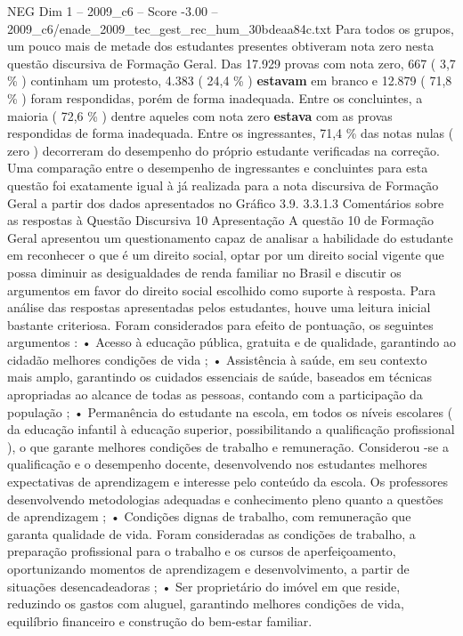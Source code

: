 \begin{textsample}{NEG Dim 1 – 2009\_c6 – Score -3.00 – 2009\_c6/enade\_2009\_tec\_gest\_rec\_hum\_30bdeaa84c.txt}
Para todos os grupos, um pouco mais de metade dos estudantes presentes obtiveram nota zero nesta questão discursiva de Formação Geral.
Das 17.929 provas com nota zero, 667 ( 3,7 \% ) continham um protesto, 4.383 ( 24,4 \% ) \textbf{estavam} em branco e 12.879 ( 71,8 \% ) foram respondidas, porém de forma inadequada.
Entre os concluintes, a maioria ( 72,6 \% ) dentre aqueles com nota zero \textbf{estava} com as provas respondidas de forma inadequada.
Entre os ingressantes, 71,4 \% das notas nulas ( zero ) decorreram do desempenho do próprio estudante verificadas na correção.
Uma comparação entre o desempenho de ingressantes e concluintes para esta questão foi exatamente igual à já realizada para a nota discursiva de Formação Geral a partir dos dados apresentados no Gráfico 3.9. 3.3.1.3 Comentários sobre as respostas à Questão Discursiva 10 Apresentação A questão 10 de Formação Geral apresentou um questionamento capaz de analisar a habilidade do estudante em reconhecer o que é um direito social, optar por um direito social vigente que possa diminuir as desigualdades de renda familiar no Brasil e discutir os argumentos em favor do direito social escolhido como suporte à resposta.
Para análise das respostas apresentadas pelos estudantes, houve uma leitura inicial bastante criteriosa.
Foram considerados para efeito de pontuação, os seguintes argumentos : • Acesso à educação pública, gratuita e de qualidade, garantindo ao cidadão melhores condições de vida ; • Assistência à saúde, em seu contexto mais amplo, garantindo os cuidados essenciais de saúde, baseados em técnicas apropriadas ao alcance de todas as pessoas, contando com a participação da população ; • Permanência do estudante na escola, em todos os níveis escolares ( da educação infantil à educação superior, possibilitando a qualificação profissional ), o que garante melhores condições de trabalho e remuneração.
Considerou -se a qualificação e o desempenho docente, desenvolvendo nos estudantes melhores expectativas de aprendizagem e interesse pelo conteúdo da escola.
Os professores desenvolvendo metodologias adequadas e conhecimento pleno quanto a questões de aprendizagem ; • Condições dignas de trabalho, com remuneração que garanta qualidade de vida.
Foram consideradas as condições de trabalho, a preparação profissional para o trabalho e os cursos de aperfeiçoamento, oportunizando momentos de aprendizagem e desenvolvimento, a partir de situações desencadeadoras ; • Ser proprietário do imóvel em que reside, reduzindo os gastos com aluguel, garantindo melhores condições de vida, equilíbrio financeiro e construção do bem-estar familiar.

\end{textsample}
